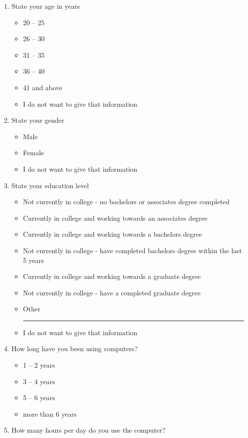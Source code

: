 \documentclass[doctor]{thesis} %
\theoremstyle{plain}
\begin{document}
\begin{enumerate}[topsep=-4em]
\item State your age in years
\begin{itemize}[topsep=-6em, label={o}]
\itemsep-1em 
\item 20 -- 25
\item 26 -- 30
\item 31 -- 35
\item 36 -- 40
\item 41 and above
\item I do not want to give that information
\end{itemize}
\item State your gender
\begin{itemize}[topsep=-6em, label={o}]
\itemsep-1em 
\item Male
\item Female
\item I do not want to give that information
\end{itemize}
\item State your education level
\begin{itemize}[topsep=-6em, label={o}]
\itemsep-1em 
\item Not currently in college - no bachelors or associates degree completed
\item Currently in college and working towards an associates degree
\item Currently in college and working towards a bachelors degree
\item Not currently in college - have completed bachelors degree within the last 5 years
\item Currently in college and working towards a graduate degree
\item Not currently in college - have a completed graduate degree
\item Other \rule{4cm}{0.4pt}
\item I do not want to give that information
\end{itemize}
\item How long have you been using computers?
\begin{itemize}[topsep=-6em, label={o}]
\itemsep-1em 
\item 1 -- 2 years
\item 3 -- 4 years
\item 5 -- 6 years
\item more than 6 years
\end{itemize}
\item How many hours per day do you use the computer?

\end{enumerate}
\end{document}
